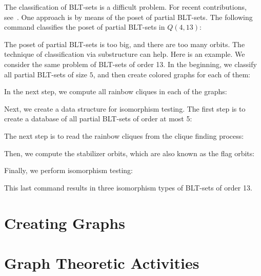 \bigskip

The classification of BLT-sets is a difficult problem. 
For recent contributions, see~\cite{AlAzemiBettenChowdhury18,Betten13,Law03}.
One approach is by means of the poset of partial BLT-sets. 
The following command classifies the poset of partial BLT-sets in  $Q(4,13)$:
{\tt

}
The poset of partial BLT-sets is too big, and there are too many orbits. 
The technique of classification via substructure can help. 
Here is an example. We consider the same problem of BLT-sets of order 13. 
In the beginning, we classify all partial BLT-sets 
of size $5$, and then create colored graphs for each 
of them: 
{\tt

}
In the next step, we compute all rainbow cliques in each of the graphs:
{\tt

}
Next, we create a data structure for isomorphism testing. 
The first step is to create a database of 
all partial BLT-sets of order at most 5:
{\tt

}
The next step is to read the rainbow cliques from the clique finding process:
{\tt

}
Then, we compute the stabilizer orbits, which are also known as the flag orbits:
{\tt

}
Finally, we perform isomorphism testing:
{\tt

}
This last command results in three isomorphism types of BLT-sets of order 13.



\section{Creating Graphs}
\label{sec:graphtheory}






\bigskip


\clearpage


\section{Graph Theoretic Activities}
\label{sec:graph:theoretic:acivities}






\bigskip


